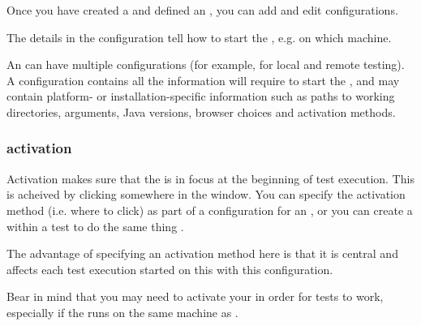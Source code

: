 


Once you have created a \gdproject{}  and defined an \gdaut{} , you can add and edit \gdaut{} configurations. 

The details in the \gdaut{} configuration tell \app{} how to start the \gdaut{}, e.g. on which machine. 

An \gdaut{} can have multiple configurations (for example, for local and remote testing). A configuration contains all the information \app{} will require to start the \gdaut{}, and may contain platform- or installation-specific information such as paths to working directories, \gdaut{} arguments, Java versions, browser choices and activation methods. 


\subsubsection{\gdaut{} activation}
\label{TasksAUTActivation}

Activation makes sure that the  \gdaut{} is in focus at the beginning of test execution. This is acheived by clicking somewhere in the \gdaut{} window. You can specify the activation method (i.e. where to click) as part of a configuration for an \gdaut{}, or you can create a \gdstep{} within a test to do the same thing . 

The advantage of specifying an activation method here is that it is central and affects each test execution started on this \gdaut{} with this configuration. 

Bear in mind that you may need to activate your \gdaut{} in order for tests to work, especially if the \gdaut{} runs on the same machine as \app{}. 
